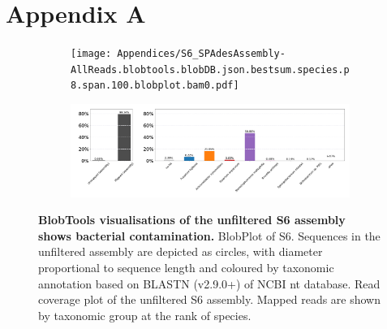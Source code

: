 \captionsetup{subrefformat=parens}
\newpage
\section{Appendix A}
\label{apx:BlobToolsAnalysis}
\begin{figure}[h!]
    \centering
    \begin{subfigure}[]{0.78\textwidth}
        \centering
        \texttt{[image: Appendices/S6\_SPAdesAssembly-AllReads.blobtools.blobDB.json.bestsum.species.p8.span.100.blobplot.bam0.pdf]}
        \caption{}
        \label{fig:BlobPlot-S6-All}
    \end{subfigure}
    \begin{subfigure}[]{0.9\textwidth}
        \centering
        \includegraphics[width=\textwidth]{Appendices/S6_SPAdesAssembly-AllReads.blobtools.blobDB.json.bestsum.species.p8.span.100.blobplot.read_cov.bam0.pdf}
        \caption{}
        \label{fig:BlobPlot_readcov-S6-All}
    \end{subfigure}
    \caption[BlobTools visualisations of the unfiltered S6 assembly]{\textbf{BlobTools visualisations of the unfiltered S6 assembly shows bacterial contamination.}
         BlobPlot of S6. Sequences in the unfiltered assembly are depicted as circles, with diameter proportional to sequence length and coloured by taxonomic annotation based on BLASTN (v2.9.0+) of NCBI nt database.
         Read coverage plot of the unfiltered S6 assembly. Mapped reads are shown by taxonomic group at the rank of species.}
        \label{fig:S6:BlobToolsAllreads}
\end{figure}

